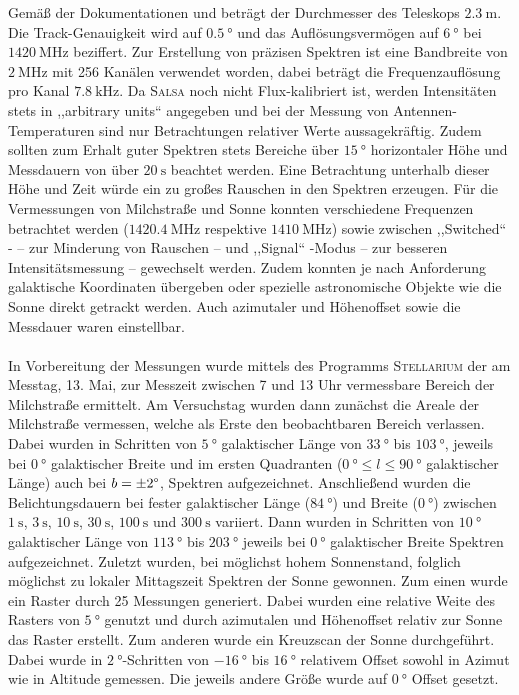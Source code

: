 Gemäß der Dokumentationen \cite{Usermanual} und \cite{AntennaResp} beträgt der Durchmesser des Teleskops $\SI{2.3}{\metre}$. Die Track-Genauigkeit wird auf $\SI{0.5}{\degree}$ und das Auflösungsvermögen auf $\SI{6}{\degree}$ bei $\SI{1420}{\mega \hertz}$ beziffert.
Zur Erstellung von präzisen Spektren ist eine Bandbreite von $\SI{2}{\mega \hertz}$ mit 256 Kanälen verwendet worden, dabei beträgt die Frequenzauflösung pro Kanal $\SI{7.8}{\kilo \hertz}$.
Da \textsc{Salsa} noch nicht Flux-kalibriert ist, werden Intensitäten stets in ,,arbitrary units`` angegeben und bei der Messung von Antennen-Temperaturen sind nur Betrachtungen relativer Werte aussagekräftig.
Zudem sollten zum Erhalt guter Spektren stets Bereiche über $\SI{15}{\degree}$ horizontaler Höhe und Messdauern von über $\SI{20}{\second}$ beachtet werden. Eine Betrachtung unterhalb dieser Höhe und Zeit würde ein zu großes Rauschen in den Spektren erzeugen.
Für die Vermessungen von Milchstraße und Sonne konnten verschiedene Frequenzen betrachtet werden ($\SI{1420.4}{\mega \hertz}$ respektive $\SI{1410}{\mega \hertz}$) sowie zwischen  ,,Switched`` - -- zur Minderung von Rauschen --  und ,,Signal`` -Modus -- zur besseren Intensitätsmessung -- gewechselt werden.
Zudem konnten je nach Anforderung galaktische Koordinaten übergeben oder spezielle astronomische Objekte wie die Sonne direkt getrackt werden.
Auch azimutaler und Höhenoffset sowie die Messdauer waren einstellbar.\\ 
\\ 
In Vorbereitung der Messungen wurde mittels des Programms \textsc{Stellarium} der am Messtag, 13. Mai, zur Messzeit zwischen 7 und 13 Uhr vermessbare Bereich der Milchstraße ermittelt.
Am Versuchstag wurden dann zunächst die Areale der Milchstraße vermessen, welche als Erste den beobachtbaren Bereich verlassen.
Dabei wurden in Schritten von $\SI{5}{\degree}$ galaktischer Länge von $\SI{33}{\degree}$ bis $\SI{103}{\degree}$, jeweils bei $\SI{0}{\degree}$ galaktischer Breite und im ersten Quadranten ($\SI{0}{\degree} \le l \le \SI{90}{\degree}$ galaktischer Länge) auch bei $b=\pm \si{2}{\degree}$, Spektren aufgezeichnet.
Anschließend wurden die Belichtungsdauern bei fester galaktischer Länge ($\SI{84}{\degree}$) und Breite ($\SI{0}{\degree}$) zwischen $\SI{1}{\second}$, $\SI{3}{\second}$, $\SI{10}{\second}$, $\SI{30}{\second}$, $\SI{100}{\second}$ und $\SI{300}{\second}$ variiert.
Dann wurden in Schritten von $\SI{10}{\degree}$ galaktischer Länge von $\SI{113}{\degree}$ bis $\SI{203}{\degree}$ jeweils bei $\SI{0}{\degree}$ galaktischer Breite Spektren aufgezeichnet.
Zuletzt wurden, bei möglichst hohem Sonnenstand, folglich möglichst zu lokaler Mittagszeit Spektren der Sonne gewonnen.
Zum einen wurde ein Raster durch 25 Messungen generiert.
Dabei wurden eine relative Weite des Rasters von $\SI{5}{\degree}$ genutzt und durch azimutalen und Höhenoffset relativ zur Sonne das Raster erstellt.
Zum anderen wurde ein Kreuzscan der Sonne durchgeführt.
Dabei wurde in $\SI{2}{\degree}$-Schritten von $\SI{-16}{\degree}$ bis $\SI{16}{\degree}$ relativem Offset sowohl in Azimut wie in Altitude gemessen. Die jeweils andere Größe wurde auf $\SI{0}{\degree}$ Offset gesetzt.